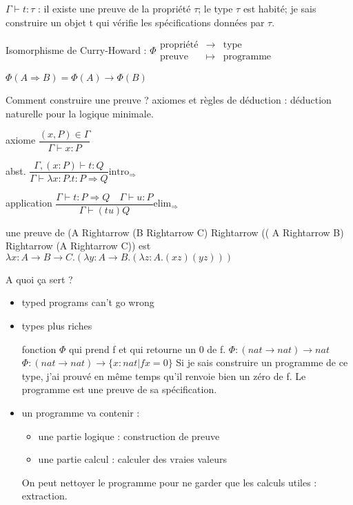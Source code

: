\documentclass[10pt,a4paper]{article}
\begin{document}
$\Gamma \vdash t  : \tau$  : il existe une preuve de la propriété $\tau$; le type  $\tau$ est habité; je sais construire un objet t qui vérifie les spécifications données par $\tau$.

Isomorphisme de Curry-Howard :
$\Phi
\begin{array}{lll}
\text{propriété}& → & \text{type} \\
\text{preuve} &\mapsto&  \text{programme}
\end{array}$

$\Phi(A \Rightarrow B) = \Phi(A) → \Phi(B)$

Comment construire une preuve ?
axiomes et règles de déduction : déduction naturelle pour la logique minimale.

axiome $\dfrac{(x,P) \in \Gamma}{\Gamma \vdash x: P}$

abst. $\dfrac{\Gamma, (x:P) \vdash t:Q}{\Gamma  \vdash \lambda x:P.t : P \Rightarrow Q} \text{intro}_{\Rightarrow}$

application $\dfrac{\Gamma \vdash t : P \Rightarrow Q \quad \Gamma \vdash u:P}{\Gamma \vdash (t u) Q}\text{elim}_{\Rightarrow}$

\begin{ex}
 une preuve de (A Rightarrow (B Rightarrow C) Rightarrow (( A Rightarrow B) Rightarrow (A Rightarrow C)) est \\
$\lambda x : A → B → C . (\lambda y : A → B. ( \lambda z : A . (x z) (y z)))$
\end{ex}

A quoi ça sert ? 
\begin{itemize}
 \item \og typed programs can't go wrong \fg
 \item types plus riches \begin{ex}
                          fonction $\Phi$ qui prend f et qui retourne un 0 de f.
                          $\Phi: (nat → nat ) → nat$
                          $\Phi: (nat → nat ) → \{ x : nat | f x = 0 \}$ Si je sais construire un programme de ce type, j'ai prouvé en même temps qu'il renvoie bien un zéro de f.
                          Le programme est une preuve de sa spécification.
                         \end{ex}
 \item un programme va contenir : \begin{itemize}
                          \item une partie logique : construction de preuve
                          \item une partie calcul : calculer des \og vraies valeurs \fg
                         \end{itemize}
On peut nettoyer le programme pour ne garder que les calculs utiles : extraction.

\end{itemize}
\end{document}
